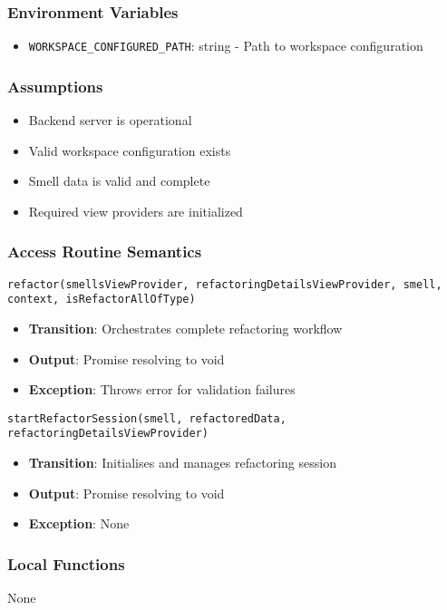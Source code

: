 \documentclass[12pt, titlepage]{article}
\begin{document}
\subsubsection{Environment Variables}
\begin{itemize}
\item \texttt{WORKSPACE\_CONFIGURED\_PATH}: string - Path to workspace configuration
\end{itemize}

\subsubsection{Assumptions}
\begin{itemize}
\item Backend server is operational
\item Valid workspace configuration exists
\item Smell data is valid and complete
\item Required view providers are initialized
\end{itemize}

\subsubsection{Access Routine Semantics}
\texttt{refactor(smellsViewProvider, refactoringDetailsViewProvider, smell, context, isRefactorAllOfType)}
\begin{itemize}
\item \textbf{Transition}: Orchestrates complete refactoring workflow
\item \textbf{Output}: Promise resolving to void
\item \textbf{Exception}: Throws error for validation failures
\end{itemize}

\texttt{startRefactorSession(smell, refactoredData, refactoringDetailsViewProvider)}
\begin{itemize}
\item \textbf{Transition}: Initialises and manages refactoring session
\item \textbf{Output}: Promise resolving to void
\item \textbf{Exception}: None
\end{itemize}

\subsubsection{Local Functions}
None
\end{document}
